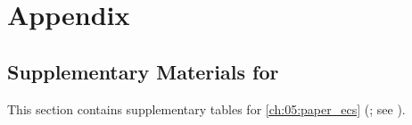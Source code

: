 


\chapter{Appendix}

\begingroup


\renewcommand{\thesection}{\Alph{section}}


\section{Supplementary Materials for
  \texorpdfstring{}{Chapter \ref{ch:05:paper_ecs}}}
\label{sec:app:cmip_models_in_chapter_5}

This section contains supplementary tables for \cref{ch:05:paper_ecs}
(; see \cite{Schlund2020a}).

